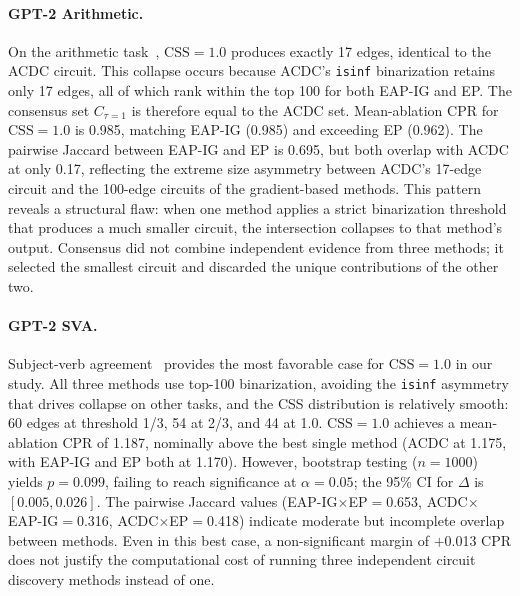 \paragraph{GPT-2 Arithmetic.}
On the arithmetic task~\cite{hanna2023how}, $\text{CSS}=1.0$ produces exactly 17 edges, identical to the ACDC circuit.
This collapse occurs because ACDC's \texttt{isinf} binarization retains only 17 edges, all of which rank within the top 100 for both EAP-IG and EP.
The consensus set $C_{\tau=1}$ is therefore equal to the ACDC set.
Mean-ablation CPR for $\text{CSS}=1.0$ is 0.985, matching EAP-IG (0.985) and exceeding EP (0.962).
The pairwise Jaccard between EAP-IG and EP is 0.695, but both overlap with ACDC at only 0.17, reflecting the extreme size asymmetry between ACDC's 17-edge circuit and the 100-edge circuits of the gradient-based methods.
This pattern reveals a structural flaw: when one method applies a strict binarization threshold that produces a much smaller circuit, the intersection collapses to that method's output.
Consensus did not combine independent evidence from three methods; it selected the smallest circuit and discarded the unique contributions of the other two.

\paragraph{GPT-2 SVA.}
Subject-verb agreement~\cite{linzen2016assessing} provides the most favorable case for $\text{CSS}=1.0$ in our study.
All three methods use top-100 binarization, avoiding the \texttt{isinf} asymmetry that drives collapse on other tasks, and the CSS distribution is relatively smooth: 60 edges at threshold 1/3, 54 at 2/3, and 44 at 1.0.
$\text{CSS}=1.0$ achieves a mean-ablation CPR of 1.187, nominally above the best single method (ACDC at 1.175, with EAP-IG and EP both at 1.170).
However, bootstrap testing ($n{=}1000$) yields $p = 0.099$, failing to reach significance at $\alpha = 0.05$; the 95\% CI for $\Delta$ is $[0.005, 0.026]$.
The pairwise Jaccard values (EAP-IG${\times}$EP${=}$0.653, ACDC${\times}$EAP-IG${=}$0.316, ACDC${\times}$EP${=}$0.418) indicate moderate but incomplete overlap between methods.
Even in this best case, a non-significant margin of $+$0.013 CPR does not justify the computational cost of running three independent circuit discovery methods instead of one.

